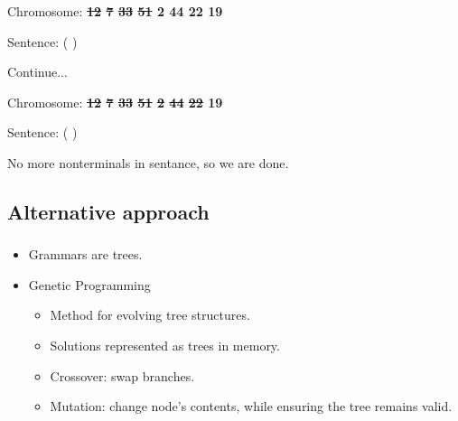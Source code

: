 \documentclass{beamer}
\makeatletter
\newcommand*{\currentname}{\@currentlabelname}
\makeatother
\begin{document}
\begin{frame}
\begin{itemize}
	{		
		\item Chromosome: \textbf{\sout{12} \sout{7} \sout{33} \sout{51} 2 44 22 19}
		\item Sentence:  \lit*{-} (  )
		\item Continue...
	}

	{		
		\item Chromosome: \textbf{\sout{12} \sout{7} \sout{33} \sout{51} \sout{2} \sout{44} \sout{22} 19}
		\item Sentence:  \lit*{-} ( \lit*{+} )
		\item No more nonterminals in sentance, so we are done.
	}

\end{itemize}
\end{frame}

\subsection{Alternative approach}
\begin{frame}
\frametitle{\currentname}

\begin{itemize}
	\item Grammars are trees.
\end{itemize}

\begin{itemize}
	\item Genetic Programming
	\begin{itemize}
		\item Method for evolving tree structures.
		\item Solutions represented as trees in memory.
		\item Crossover: swap branches.
		\item Mutation: change node's contents, while ensuring the tree remains valid.
	\end{itemize}
\end{itemize}

\end{frame}
\end{document}

